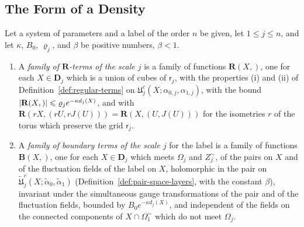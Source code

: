 \documentclass[11pt]{preprint}
\makeatletter
\DeclarePairedDelimiter{\abs}{\lvert}{\rvert}
\newcommand*{\bigcdot}{}%
\DeclareRobustCommand*{\bigcdot}{%
	\mathbin{\mathpalette\bigcdot@{}}%
}
\newcommand*{\bigcdot@scalefactor}{.7}
\newcommand*{\bigcdot@widthfactor}{1.15}
\newcommand*{\bigcdot@}[2]{%
	\sbox0{$#1\vcenter{}$}%
	\sbox2{$#1\cdot\m@th$}%
	\hbox to \bigcdot@widthfactor\wd2{%
		\hss
		\raise\ht0\hbox{%
			\scalebox{\bigcdot@scalefactor}{%
				\lower\ht0\hbox{$#1\bullet\m@th$}%
			}%
		}%
		\hss
	}%
}
\numberwithin{equation}{section}
\makeatother
\begin{document}
\subsection{The Form of a Density}\label{sec:density-form}

\begin{definition}\label{def:other-terms}
Let a system of parameters and a label of the order $n$ be given, let $1 \leqslant j \leqslant n$, and let $\kappa$, $B_0$, $\varrho_j$, and $\beta$ be positive numbers, $\beta < 1$.
\begin{enumerate}[label=(\roman*)]
\item A \emph{family of $\mathbf R$-terms of the scale $j$} is a family of functions $\mathbf R(X, \bigcdot)$, one for each $X \in \mathbf D_j$ which is a union of cubes of $\mathsf r_j$, with the properties (i) and (ii) of Definition~\ref{def:regular-terms} on $\mathfrak U^c_j(X; \alpha_{0,j}, \alpha_{1,j})$, with the bound $\abs{\mathbf R(X, \bigcdot)} \leqslant \varrho_je^{-\kappa d_j(X)}$, and with $\mathbf R(rX, (rU, rJ(U))) = \mathbf R(X, (U, J(U)))$ for the isometries $r$ of the torus which preserve the grid $\mathsf r_j$.
\item A \emph{family of boundary terms of the scale $j$} for the label is a family of functions $\mathbf B(X, \bigcdot)$, one for each $X \in \mathbf D_j$ which meets $\Omega_j$ and $Z_j^\sim$, of the pairs on $X$ and of the fluctuation fields of the label on $X$, holomorphic in the pair on $\tilde{\mathfrak U}^c_j(X; \tilde\alpha_0, \tilde\alpha_1)$ (Definition~\ref{def:pair-space-layers}, with the constant $\beta$), invariant under the simultaneous gauge transformations of the pair and of the fluctuation fields, bounded by $B_0e^{-\kappa d_j(X)}$, and independent of the fields on the connected components of $X \cap \Omega_1^\sim$ which do not meet $\Omega_j$.
\end{enumerate}
\end{definition}
\end{document}
